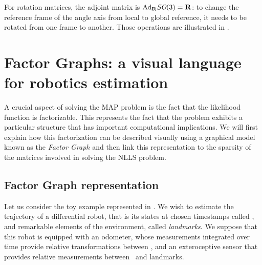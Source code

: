 For rotation matrices, the adjoint matrix is $\text{Ad}_{{\bf R}}\textit{SO}(3)={\bf R}$: to change the reference frame of the angle axis from local to global reference, it needs
to be rotated from one frame to another. Those operations are illustrated in .


%
%
%
\section{Factor Graphs: a visual language for robotics estimation}
\label{sec:factor_graphs}

A crucial aspect of solving the MAP problem is the fact that the likelihood function is factorizable. This represents the fact that the problem
exhibits a particular structure that has important computational implications. We will first explain how this factorization can be described 
visually using a graphical model known as the \textit{Factor Graph} and then link this representation to the sparsity of the matrices involved
in solving the NLLS problem.


\subsection{Factor Graph representation}
Let us consider the toy example represented in . 
We wish to estimate the trajectory of a differential robot, that is its states at chosen timestamps called \textit{\keyframes}, and remarkable elements 
of the environment, called \textit{landmarks}. We suppose that this robot is equipped with an odometer, whose measurements integrated over time provide relative 
transformations between \keyframes, and an exteroceptive sensor that provides relative measurements between \keyframes~and landmarks.

